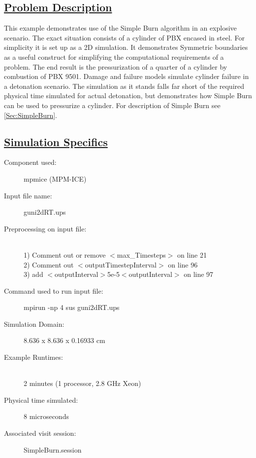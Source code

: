 \subsection*{\underline{Problem Description}}
This example demonstrates use of the Simple Burn algorithm in an explosive scenario.  
The exact situation consists of a cylinder of PBX encased in steel.  For simplicity it is set up 
as a 2D simulation.  It demonstrates Symmetric boundaries as a useful construct for simplifying
the computational requirements of a problem.  The end result is the pressurization of a quarter
of a cylinder by combustion of PBX 9501.  Damage and failure models simulate cylinder failure
in a detonation scenario.  The simulation as it stands falls far short of the required physical time 
simulated for actual detonation, but demonstrates how Simple Burn can be used to pressurize 
a cylinder.  For description of Simple Burn see \ref{Sec:SimpleBurn}.

\subsection*{\underline{Simulation Specifics}}
\begin{description}
\item [Component used:] \hfill mpmice (MPM-ICE)
\item [Input file name:] \hfill guni2dRT.ups
\item [Preprocessing on input file:]\hfill \\ 1) Comment out or remove $<$max\_Timesteps$>$ on line 21 \\
2) Comment out $<$outputTimestepInterval$>$ on line 96 \\ 
3) add $<$outputInterval$>$5e-5$<$outputInterval$>$ on line 97 \\
\item [Command used to run input file:]\hfill mpirun -np 4 sus guni2dRT.ups

\item [Simulation Domain:]\hfill    8.636 x 8.636 x 0.16933 cm

\item [Example Runtimes:] \hfill \\
2 minutes   (1 processor, 2.8 GHz Xeon)\\

\item [Physical time simulated:] \hfill 8 microseconds \\ 


\item [Associated visit session:] \hfill SimpleBurn.session

\end{description}

